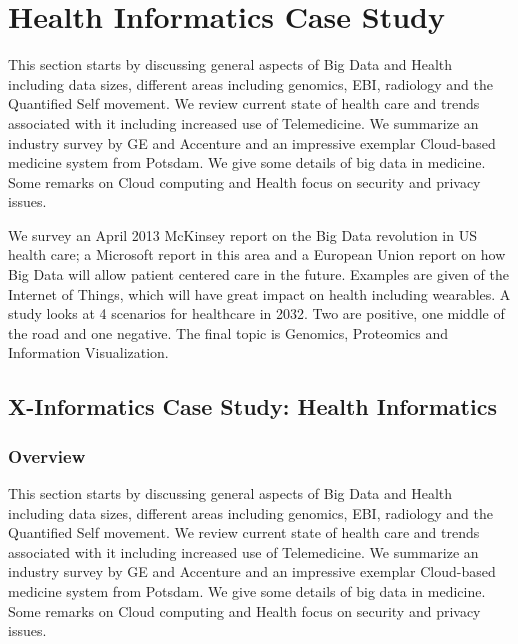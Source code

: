 \FILENAME

\section{Health Informatics Case
Study}\label{health-informatics-case-study}

This section starts by discussing general aspects of Big Data and Health
including data sizes, different areas including genomics, EBI, radiology
and the Quantified Self movement. We review current state of health care
and trends associated with it including increased use of Telemedicine.
We summarize an industry survey by GE and Accenture and an impressive
exemplar Cloud-based medicine system from Potsdam. We give some details
of big data in medicine. Some remarks on Cloud computing and Health
focus on security and privacy issues.

We survey an April 2013 McKinsey report on the Big Data revolution in US
health care; a Microsoft report in this area and a European Union report
on how Big Data will allow patient centered care in the future. Examples
are given of the Internet of Things, which will have great impact on
health including wearables. A study looks at 4 scenarios for healthcare
in 2032. Two are positive, one middle of the road and one negative. The
final topic is Genomics, Proteomics and Information Visualization.

\subsection{X-Informatics Case Study: Health
Informatics}\label{x-informatics-case-study-health-informatics}

\subsubsection{Overview}\label{overview}


This section starts by discussing general aspects of Big Data and Health
including data sizes, different areas including genomics, EBI, radiology
and the Quantified Self movement. We review current state of health care
and trends associated with it including increased use of Telemedicine.
We summarize an industry survey by GE and Accenture and an impressive
exemplar Cloud-based medicine system from Potsdam. We give some details
of big data in medicine. Some remarks on Cloud computing and Health
focus on security and privacy issues.

